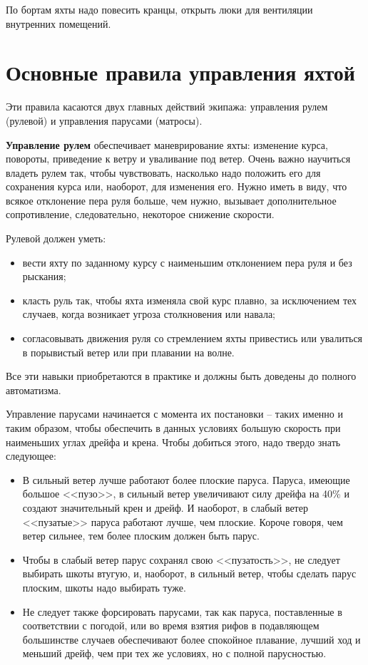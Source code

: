 \documentclass[a4paper, 12pt, twoside, final]{scrbook}
\begin{document}
По бортам яхты надо повесить кранцы, открыть люки для вентиляции внутренних помещений.

\section{Основные правила управления яхтой}

Эти правила касаются двух главных действий экипажа: управления рулем (рулевой) и управления парусами (матросы).

\textbf{Управление рулем} обеспечивает маневрирование яхты: изменение курса, повороты, приведение к ветру и уваливание под ветер. Очень важно научиться владеть рулем так, чтобы чувствовать, насколько надо положить его для сохранения курса или, наоборот, для изменения его. Нужно иметь в виду, что всякое отклонение пера руля больше, чем нужно, вызывает дополнительное сопротивление, следовательно, некоторое снижение скорости.

Рулевой должен уметь:

\begin{itemize}
\item вести яхту по заданному курсу с наименьшим отклонением пера руля и без рыскания;
\item класть руль так, чтобы яхта изменяла свой курс плавно, за исключением тех случаев, когда возникает угроза столкновения или навала;
\item согласовывать движения руля со стремлением яхты привестись или увалиться в порывистый ветер или при плавании на волне.
\end{itemize}

Все эти навыки приобретаются в практике и должны быть доведены до полного автоматизма.

Управление парусами начинается с момента их постановки \--- таких именно и таким образом, чтобы обеспечить в данных условиях большую скорость при наименьших углах дрейфа и крена. Чтобы добиться этого, надо твердо знать следующее:

\begin{itemize}
\item В сильный ветер лучше работают более плоские паруса. Паруса, имеющие большое <<пузо>>, в сильный ветер увеличивают силу дрейфа на 40\% и создают значительный крен и дрейф. И наоборот, в слабый ветер <<пузатые>> паруса работают лучше, чем плоские. Короче говоря, чем ветер сильнее, тем более плоским должен быть парус.

\item Чтобы в слабый ветер парус сохранял свою <<пузатость>>, не следует выбирать шкоты втугую, и, наоборот, в сильный ветер, чтобы сделать парус плоским, шкоты надо выбирать туже.

\item Не следует также форсировать парусами, так как паруса, поставленные в соответствии с погодой, или во время взятия рифов в подавляющем большинстве случаев обеспечивают более спокойное плавание, лучший ход и меньший дрейф, чем при тех же условиях, но с полной парусностью.
\end{itemize}
\end{document}
